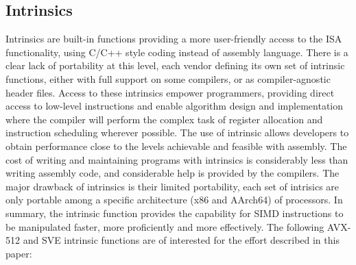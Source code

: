 \documentclass[5p,times,twocolumn]{elsarticle}
\begin{document}
\subsection{Intrinsics}
Intrinsics are built-in functions providing a more user-friendly access to the ISA functionality,
using C/C++ style coding instead of assembly language. 
There is a clear lack of portability at this level, each vendor defining its own set of intrinsic functions, either with full support on some compilers, or as compiler-agnostic header files. Access to these intrinsics empower programmers, providing direct access to low-level instructions and enable algorithm design and implementation
where the compiler will perform the complex task of register allocation
and instruction scheduling wherever possible.
%
The use of intrinsic allows developers to obtain performance close to the levels achievable and feasible with assembly.
The cost of writing and maintaining programs with intrinsics is considerably less than writing assembly code, and considerable help is provided by the compilers.
The major drawback of intrinsics is their limited portability, each set of intrisics are only portable among a specific architecture (x86 and AArch64) of processors.
In summary, the intrinsic function provides the capability for SIMD instructions to be manipulated faster, more
proficiently and more effectively.
The following AVX-512 and SVE intrinsic functions are of interested for the effort described in this paper:
\end{document}
